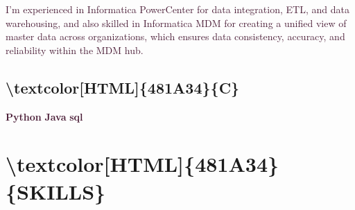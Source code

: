 \documentclass[12pt]{article}%
\begin{document}
%
\begin{justify}%
\textcolor[HTML]{481A34}{I'm experienced in Informatica PowerCenter for}\textcolor[HTML]{481A34}{ }\textcolor[HTML]{481A34}{data}\textcolor[HTML]{481A34}{ }\textcolor[HTML]{481A34}{integration,}\textcolor[HTML]{481A34}{ }\textcolor[HTML]{481A34}{ETL,}\textcolor[HTML]{481A34}{ }\textcolor[HTML]{481A34}{and}\textcolor[HTML]{481A34}{ }\textcolor[HTML]{481A34}{data}\textcolor[HTML]{481A34}{ }\textcolor[HTML]{481A34}{warehousing,}\textcolor[HTML]{481A34}{ }\textcolor[HTML]{481A34}{and}\textcolor[HTML]{481A34}{ }\textcolor[HTML]{481A34}{also skilled in Informatica MDM for creating a}\textcolor[HTML]{481A34}{ }\textcolor[HTML]{481A34}{unified}\textcolor[HTML]{481A34}{ }\textcolor[HTML]{481A34}{view}\textcolor[HTML]{481A34}{ }\textcolor[HTML]{481A34}{of}\textcolor[HTML]{481A34}{ }\textcolor[HTML]{481A34}{master}\textcolor[HTML]{481A34}{ }\textcolor[HTML]{481A34}{data}\textcolor[HTML]{481A34}{ }\textcolor[HTML]{481A34}{across}\textcolor[HTML]{481A34}{ }\textcolor[HTML]{481A34}{organizations,}\textcolor[HTML]{481A34}{ }\textcolor[HTML]{481A34}{which ensures data consistency, accuracy, and}\textcolor[HTML]{481A34}{ }\textcolor[HTML]{481A34}{reliability}\textcolor[HTML]{481A34}{ }\textcolor[HTML]{481A34}{within}\textcolor[HTML]{481A34}{ }\textcolor[HTML]{481A34}{the}\textcolor[HTML]{481A34}{ }\textcolor[HTML]{481A34}{MDM}\textcolor[HTML]{481A34}{ }\textcolor[HTML]{481A34}{hub.}%
\end{justify}%
\newline%
%
\subsection{\textbackslash{}textcolor{[}HTML{]}\{481A34\}\{C\}}%
\label{subsec:subsec49}%

%
\begin{flushleft}%
\textcolor[HTML]{481A34}{\textbf{Python}}\textcolor[HTML]{481A34}{\textbf{ }}\textcolor[HTML]{481A34}{\textbf{Java}}\textcolor[HTML]{481A34}{\textbf{ }}\textcolor[HTML]{481A34}{\textbf{sql}}%
\end{flushleft}%
\newline%
%
\section{\textbackslash{}textcolor{[}HTML{]}\{481A34\}\{SKILLS\}}%
\label{sec:sec51}%
\end{document}
